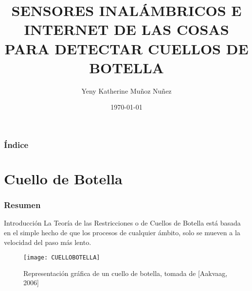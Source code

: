 \documentclass[11pt]{beamer}					%
\begin{document}
	
		\title[Data Center]{SENSORES INALÁMBRICOS E INTERNET DE LAS COSAS PARA DETECTAR CUELLOS DE BOTELLA}
		\author{Yeny Katherine Muñoz Nuñez}
		\date{\today}

		\begin{frame}
			\titlepage 
		\end{frame}
	
     	\begin{frame}
		\frametitle{Índice}	
		\tableofcontents
		\end{frame}
	
\section{Cuello de Botella}
	\begin{frame}
			\frametitle{Resumen}
				\begin{block}{Introducción}
					La Teoría de las Restricciones o de Cuellos de Botella está basada en el simple hecho de que los procesos de cualquier ámbito, solo se mueven a la velocidad del paso más lento.
				\begin{center}
				\begin{figure}[htb]
		   			\texttt{[image: CUELLOBOTELLA]}
 					\caption{ Representación gráfica de un cuello de botella, tomada de [Aakvaag, 2006]}
				\end{figure}
				\end{center}
				\end{block}
	\end{frame}

	
\end{document}
